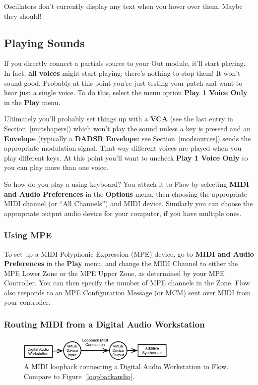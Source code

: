 \documentclass{article}
\newcommand\name{Flow}
\begin{document}
Oscillators don't currently display any text when you hover over them.  Maybe they should!

\subsection{Playing Sounds}

If you directly connect a partials source to your Out module, it'll start playing.  In fact, {\bf all voices} might start playing: there's nothing to stop them!  It won't sound good.   Probably at this point you're just testing your patch and want to hear just a single voice.  To do this, select the menu option {\bf Play 1 Voice Only} in the {\bf Play} menu.

Ultimately you'll probably set things up with a {\bf VCA} (see the last entry in Section~\ref{unitshapers}) which won't play the sound unless a key is pressed and an {\bf Envelope} (typically a {\bf DADSR Envelope}: see Section~\ref{modsources}) sends the appropriate modulation signal.  That way different voices are played when you play different keys.  At this point you'll want to uncheck {\bf Play 1 Voice Only} so you can play more than one voice.

So how do you play a using keyboard?  You attach it to {\name} by selecting {\bf MIDI and Audio Preferences} in the {\bf Options} menu, then choosing the appropriate MIDI channel (or ``All Channels'') and MIDI device.  Similarly you can choose the appropriate output audio device for your computer, if you have multiple ones.

\subsubsection{Using MPE}

To set up a MIDI Polyphonic Expression (MPE) device, go to {\bf MIDI and Audio Preferences} in the {\bf Play} menu, and change the MIDI Channel to either the MPE Lower Zone or the MPE Upper Zone, as determined by your MPE Controller.  You can then specify the number of MPE channels in the Zone.  {\name} also responds to an MPE Configuration Message (or MCM) sent over MIDI from your controller.

\subsubsection{Routing MIDI from a Digital Audio Workstation}
\label{routingmidi}

\begin{figure}
\begin{center}\vspace{-1em}\includegraphics[width=3in]{loopbackmidi}\end{center}
\vspace{-1em}
\caption{A MIDI loopback connecting a Digital Audio Workstation to {\name}.  Compare to Figure~\ref{loopbackaudio}.}\label{loopbackmidi}
\end{figure}
\end{document}
